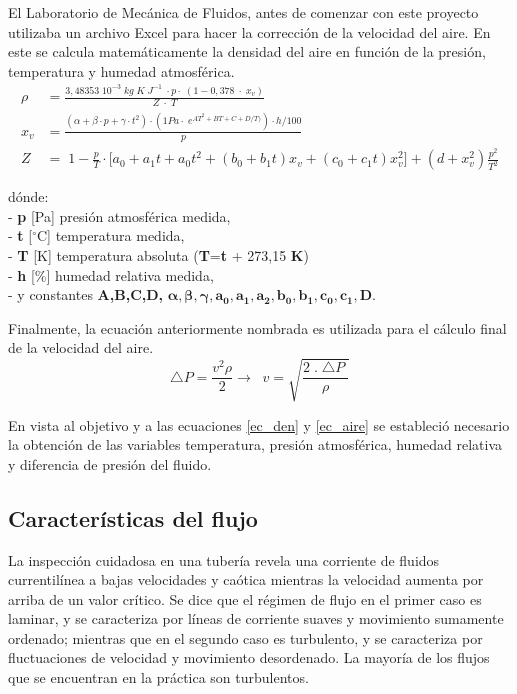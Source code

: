 
El Laboratorio de Mecánica de Fluidos, antes de comenzar con este proyecto utilizaba un archivo Excel para hacer la corrección de la velocidad del aire. En este se calcula matemáticamente la densidad del aire en función de la presión, temperatura y humedad atmosférica.
\begin{align}
	\rho&=\frac{3,48353\;10^{-3}\;kg\;K\;J^{-1}\;\cdot p\cdot\;(1-0,378\;\cdot\;x_v)}{Z\;\cdot\;T} \label{ec_den}\\
	x_v&=\frac{(\alpha+\beta\cdot p+\gamma\cdot t^2)\cdot(1Pa\cdot\;e^{AT^2+BT+C+D/T)})\cdot h/100}p\\
	Z&=\;1-\frac pT\cdot\lbrack a_0+a_1t+a_0t^2+(b_0+b_1t)x_v+(c_0+c_1t)x_v^2\rbrack+(d+x_v^2)\frac{p^2}{T^2}
\end{align}

dónde:\\
- \textbf{p } [Pa] presión atmosférica medida,\\
- \textbf{t } [$^{\circ}$C] temperatura medida,\\
- \textbf{T } [K] temperatura absoluta (\textbf{T}=\textbf{t} + 273,15 \textbf{K})\\
- \textbf{h } [\%] humedad relativa medida,\\
- y constantes \textbf{A,B,C,D,} $\boldsymbol{\alpha , \beta  , \gamma , a_0, a_1 ,a_2 ,b_0  ,b_1 , c_0 , c_1, D. }$


Finalmente, la ecuación anteriormente nombrada es utilizada para el cálculo final de la velocidad del aire.
\begin{equation}
	\triangle P=\frac{v^2\rho}2\rightarrow\;\;v=\sqrt{\frac{2\;.\;\triangle P\;}\rho}
	\label{ec_aire}
\end{equation}

En vista al objetivo y a las ecuaciones \ref{ec_den} y \ref{ec_aire} se estableció necesario la obtención de las variables temperatura, presión atmosférica, humedad relativa y diferencia de presión del fluido. 

\subsection{Características del flujo}
La inspección cuidadosa en una tubería revela una corriente de fluidos currentilínea a bajas velocidades y caótica mientras la velocidad aumenta por arriba de un valor crítico. Se dice que el régimen de flujo en el primer caso es laminar, y se caracteriza por líneas de corriente suaves y movimiento sumamente
ordenado; mientras que en el segundo caso es turbulento, y se caracteriza por
fluctuaciones de velocidad y movimiento  desordenado. La mayoría de los flujos que se encuentran en la
práctica son turbulentos. 

